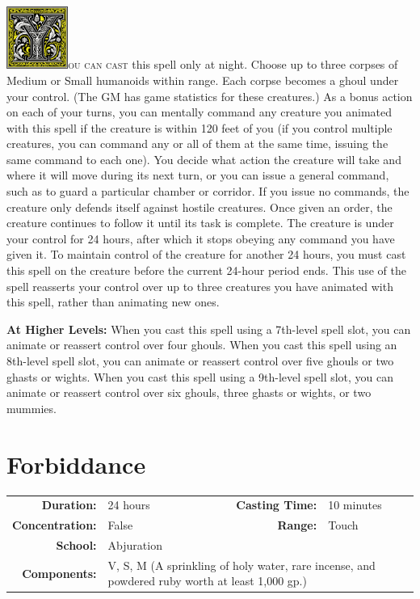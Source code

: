 \documentclass[12pt,showtrims]{memoir}
\begin{document}
\vspace{1\baselineskip}\noindent
\lettrine[lines=4]{\includegraphics[height=58pt]{initials/Y.png}}{ou can cast} this spell only at night. Choose up to three corpses of Medium or Small humanoids within range. Each corpse becomes a ghoul under your control. (The GM has game statistics for these creatures.) As a bonus action on each of your turns, you can mentally command any creature you animated with this spell if the creature is within 120 feet of you (if you control multiple creatures, you can command any or all of them at the same time, issuing the same command to each one). You decide what action the creature will take and where it will move during its next turn, or you can issue a general command, such as to guard a particular chamber or corridor. If you issue no commands, the creature only defends itself against hostile creatures. Once given an order, the creature continues to follow it until its task is complete. The creature is under your control for 24 hours, after which it stops obeying any command you have given it. To maintain control of the creature for another 24 hours, you must cast this spell on the creature before the current 24-hour period ends. This use of the spell reasserts your control over up to three creatures you have animated with this spell, rather than animating new ones.

\vspace{8pt} \noindent\textbf{At Higher Levels:} When you cast this spell using a 7th-level spell slot, you can animate or reassert control over four ghouls. When you cast this spell using an 8th-level spell slot, you can animate or reassert control over five ghouls or two ghasts or wights. When you cast this spell using a 9th-level spell slot, you can animate or reassert control over six ghouls, three ghasts or wights, or two mummies.
\newpage
\section*{Forbiddance}

{
\small\centering\vspace{-6pt}
\begin{tabular}{rlrl}
\toprule

\textbf{Duration:} & 24 hours &
\textbf{Casting Time:} & 10 minutes \\
\textbf{Concentration:} & False &
\textbf{Range:} & Touch \\
\textbf{School:} & Abjuration \\
\textbf{Components:} & \multicolumn{3}{p{0.7\textwidth}}{V, S, M (A sprinkling of holy water, rare incense, and powdered ruby worth at least 1,000 gp.)}\\

\bottomrule
\end{tabular}
}
\end{document}
